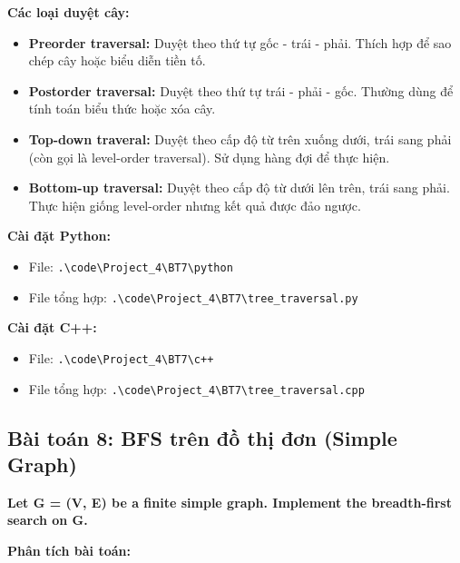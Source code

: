 \documentclass[12pt,a4paper]{article}
\begin{document}
\textbf{Các loại duyệt cây:}

\begin{itemize}[label=\textbullet]
    \item \textbf{Preorder traversal:} Duyệt theo thứ tự gốc - trái - phải. Thích hợp để sao chép cây hoặc biểu diễn tiền tố.
    \item \textbf{Postorder traversal:} Duyệt theo thứ tự trái - phải - gốc. Thường dùng để tính toán biểu thức hoặc xóa cây.
    \item \textbf{Top-down traveral:} Duyệt theo cấp độ từ trên xuống dưới, trái sang phải (còn gọi là level-order traversal). Sử dụng hàng đợi để thực hiện.
    \item \textbf{Bottom-up traversal:} Duyệt theo cấp độ từ dưới lên trên, trái sang phải. Thực hiện giống level-order nhưng kết quả được đảo ngược.
\end{itemize}


\textbf{Cài đặt Python:}
\begin{itemize}[label=\textbullet]
    \item File: \texttt{.\textbackslash code\textbackslash Project\_4\textbackslash BT7\textbackslash python}
   \item File tổng hợp: \texttt{.\textbackslash code\textbackslash Project\_4\textbackslash BT7\textbackslash tree\_traversal.py}
\end{itemize}

\textbf{Cài đặt C++:}
\begin{itemize}[label=\textbullet]
    \item File: \texttt{.\textbackslash code\textbackslash Project\_4\textbackslash BT7\textbackslash c++}
   \item File tổng hợp: \texttt{.\textbackslash code\textbackslash Project\_4\textbackslash BT7\textbackslash tree\_traversal.cpp}
\end{itemize}



\newpage
\subsection{Bài toán 8: BFS trên đồ thị đơn (Simple Graph)}

\begin{problembox}
    \textbf{Let G = (V, E) be a finite simple graph. Implement the breadth-first search on G.} 
\end{problembox}

\textbf{Phân tích bài toán:}
\vspace{0.5cm}
\end{document}
